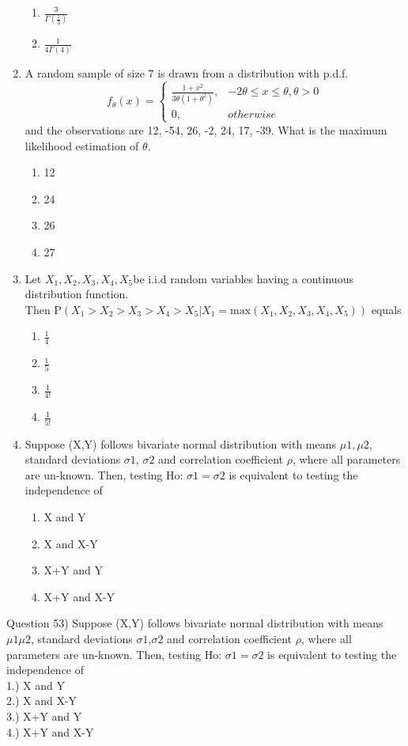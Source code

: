 \documentclass[journal,12pt,twocolumn]{IEEEtran}
\begin{document}
\begin{enumerate}[label=\arabic*.,ref=\theenumi]
\begin{enumerate}
\item $\frac{3}{\Gamma (\frac{1}{3})}$
\item $\frac{1}{4\Gamma(4) }$
\end{enumerate}
\item A random sample of size 7 is drawn from a distribution with p.d.f. \\ 
\[
    f_\theta(x)= 
\begin{cases}
\frac{1 + x^2}{3\theta(1+\theta^2)},& -2\theta \leq x \leq \theta, \theta > 0\\
    0,              & otherwise
\end{cases}
\]
and the observations are 12, -54, 26, -2, 24, 17, -39. What is the maximum likelihood estimation of \(\theta\).
\begin{enumerate}
\item 12
\item 24
\item 26
\item 27
\end{enumerate}
\item Let $X_1, X_2, X_3, X_4, X_5 $be i.i.d random variables having a continuous distribution function. $\text {Then P}(X_1>X_2>X_3>X_4>X_5|X_1 = \text {max}(X_1,X_2,X_3,X_4,X_5))$ equals
\begin{enumerate}
\item $\displaystyle\frac{1}{4}$
\item $\displaystyle\frac{1}{5}$
\item $\displaystyle\frac{1}{4!}$
\item $\displaystyle\frac{1}{5!}$
\end{enumerate}
\item Suppose (X,Y) follows bivariate normal distribution with means $\mu1, \mu2$, standard deviations $\sigma1$, $\sigma2$ and correlation coefficient $\rho$, where all parameters are un-known. Then, testing Ho: $\sigma1=\sigma2$ is equivalent to testing the independence of  
\begin{enumerate}
\item X and Y 
\item X and X-Y  
\item X+Y and Y 
\item X+Y and X-Y 
\end{enumerate}
\end{enumerate}
Question 53) Suppose (X,Y) follows bivariate normal distribution with means $\mu1  \mu2$, standard deviations $\sigma1$,$\sigma2$ and correlation coefficient $\rho$, where all parameters are un-known. Then, testing Ho: $\sigma1=\sigma2$ is equivalent to testing the independence of  
\\
1.) X and Y \\
2.) X and X-Y \\
3.) X+Y and Y \\
4.) X+Y and X-Y \\
\\
\end{document}
